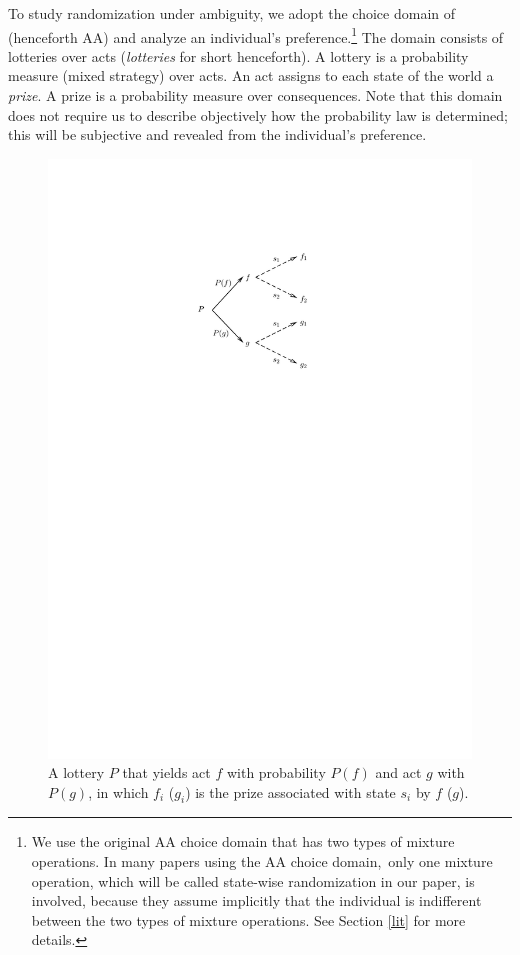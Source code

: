 \documentclass[12pt, notitlepage]{article}
\begin{document}
To study randomization under ambiguity, we adopt the choice domain of \cite%
{AA63} (henceforth AA) and analyze an individual's preference.\footnote{%
We use the original AA choice domain that has two types of mixture
operations. In many papers using the AA choice domain,\ only one mixture
operation, which will be called state-wise randomization in our paper, is
involved, because they assume implicitly that the individual is indifferent
between the two types of mixture operations. See Section \ref{lit} for more
details.} The domain consists of lotteries over acts (\textit{lotteries} for
short henceforth). A lottery is a probability measure (mixed strategy) over
acts. An act assigns to each state of the world a \textit{prize}. A prize is
a probability measure over consequences. Note that this domain does not
require us to describe objectively how the probability law is determined;
this will be subjective and revealed from the individual's preference.

\begin{figure}[h!]
  \centering   
    \includegraphics{img/object.pdf}
    \caption{A lottery $P$ that yields
act $f$ with probability $P(f)$ and act $g$ with $P(g)$, in which $f_{i}$ ($%
g_{i}$) is the prize associated with state $s_{i}$ by $f$ ($g$).}
\label{fig_obj}
\end{figure}
\end{document}

